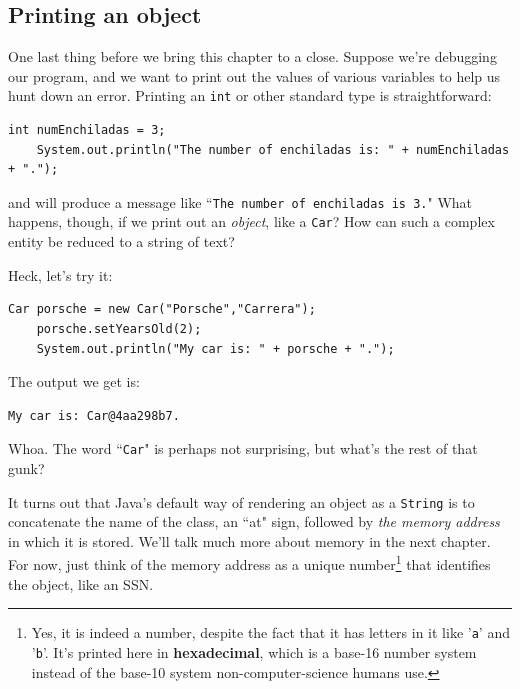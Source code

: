 \subsection{Printing an object}

One last thing before we bring this chapter to a close. Suppose we're
debugging our program, and we want to print out the values of various
variables to help us hunt down an error. Printing an \texttt{int} or other
standard type is straightforward:

\begin{Verbatim}[samepage=true,fontsize=\footnotesize,frame=single]
    int numEnchiladas = 3;
    System.out.println("The number of enchiladas is: " + numEnchiladas + ".");
\end{Verbatim}

and will produce a message like ``\texttt{The number of enchiladas is 3.}"
What happens, though, if we print out an \textit{object}, like a \texttt{Car}?
How can such a complex entity be reduced to a string of text?

Heck, let's try it:

\begin{Verbatim}[samepage=true,fontsize=\footnotesize,frame=single]
    Car porsche = new Car("Porsche","Carrera");
    porsche.setYearsOld(2);
    System.out.println("My car is: " + porsche + ".");
\end{Verbatim}

The output we get is:

\begin{verbatim}
My car is: Car@4aa298b7.
\end{verbatim}

Whoa. The word ``\texttt{Car}" is perhaps not surprising, but what's the rest
of that gunk?

It turns out that Java's default way of rendering an object as a
\texttt{String} is to concatenate the name of the class, an ``at" sign,
followed by \textit{the memory address} in which it is stored. We'll talk much
more about memory in the next chapter. For now, just think of the memory
address as a unique number\footnote{Yes, it is indeed a number, despite the
fact that it has letters in it like '\texttt{a}' and '\texttt{b}'. It's
printed here in \textbf{hexadecimal}, which is a base-16 number system instead
of the base-10 system non-computer-science humans use.} that identifies the
object, like an SSN.

